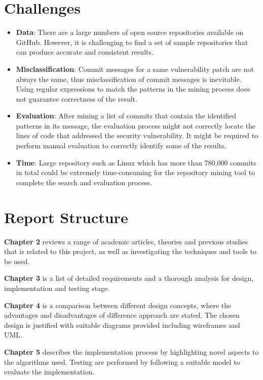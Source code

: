 \documentclass[12pt, a4paper]{report}
\begin{document}
\section{Challenges}
\begin{itemize}
	\item \textbf{Data}: There are a large numbers of open source repositories available on GitHub.
	However, it is challenging to find a set of sample repositories that can produce accurate and
	consistent results.
	\item \textbf{Misclassification}: Commit messages for a same vulnerability patch are not always
	the same, thus misclassification of commit messages is inevitable. Using regular expressions to
	match the patterns in the mining process does not guarantee correctness of the result.
	\item \textbf{Evaluation}: After mining a list of commits that contain the identified patterns in
	its message, the evaluation process might not correctly locate the lines of code that addressed
	the security vulnerability. It might be required to perform manual evaluation to correctly
	identify some of the results.
	\item \textbf{Time}: Large repository such as Linux which has more than 780,000 commits in total
	\cite{linux_repo} could be extremely time-consuming for the repository mining tool to complete the
	search and evaluation process.
\end{itemize}

\section{Report Structure}
\textbf{Chapter 2} reviews a range of academic articles, theories and previous studies that
is related to this project, as well as investigating the techniques and tools to be used.

\noindent\textbf{Chapter 3} is a list of detailed requirements and a thorough analysis for design,
implementation and testing stage.

\noindent\textbf{Chapter 4} is a comparison between different design concepts, where the advantages
and disadvantages of difference approach are stated. The chosen design is justified with suitable
diagrams provided including wireframes and UML.

\noindent\textbf{Chapter 5} describes the implementation process by highlighting novel aspects to
the algorithms used. Testing are performed by following a suitable model to evaluate the
implementation.
\end{document}
